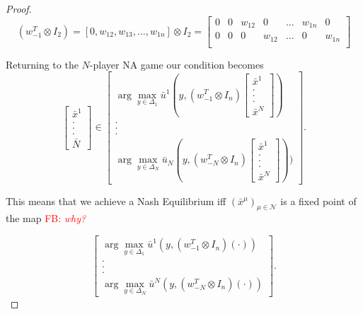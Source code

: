 \documentclass{article}
\theoremstyle{definition}
\newcommand{\fb}[1]{\textcolor{red}{FB: \textit{#1}}}
\newcommand{\agentset}{\mathcal{N}}
\newcommand{\NE}[1]{\bar{x}^{#1}}
\begin{document}
\begin{proof}
    \begin{equation}
      (w_{-1}^T \otimes I_2) = [0, w_{12}, w_{13}, ..., w_{1n}] \otimes I_2 = 
      \begin{bmatrix}
        0 & 0 & w_{12} & 0 & ... & w_{1n} & 0 \\
        0 & 0 & 0 & w_{12} & ... & 0 & w_{1n} \\
      \end{bmatrix}
    \end{equation}
    
    Returning to the $N$-player NA game our condition becomes
    \begin{equation}
      \begin{bmatrix}
        \NE{1} \\ . \\ . \\ . \\ \bar{N}
      \end{bmatrix} \in
      \begin{bmatrix}
        \arg\max_{y \in \Delta_1} \bar{u}^1(y, (w_{-1}^T \otimes I_n) \begin{bmatrix}
          \NE{1} \\ . \\ . \\ . \\ \NE{N}
        \end{bmatrix}) \\ . \\ . \\ . \\ \arg\max_{y \in \Delta_N} \bar{u}_N(y, (w_{-N}^T \otimes I_n) \begin{bmatrix}
        \NE{1} \\ . \\ . \\ . \\ \NE{N}
      \end{bmatrix}))
      \end{bmatrix} .
    \end{equation}

    This means that we achieve a Nash Equilibrium iff $(\NE{\mu})_{\mu \in \agentset}$ is a fixed point of the map \fb{why?}
  
  
    \begin{equation}
      \begin{bmatrix}
        \arg\max_{y \in \Delta_1} \bar{u}^1(y, (w_{-1}^T \otimes I_n) ( \cdot )) \\ . \\ . \\ . \\ \arg\max_{y \in \Delta_N} \bar{u}^N(y, (w_{-N}^T \otimes I_n)( \cdot ))
      \end{bmatrix} .
    \end{equation}



\end{proof}
\end{document}
